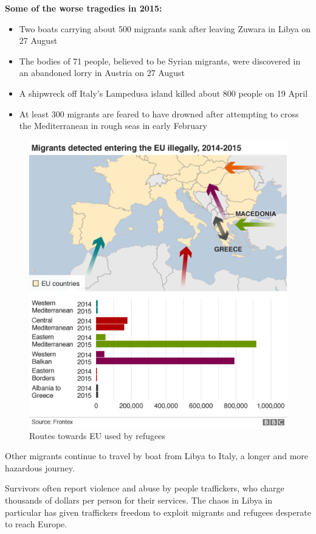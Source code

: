 \newpage
\textbf{Some of the worse tragedies in 2015:}
\begin{itemize}
	\item Two boats carrying about 500 migrants sank after leaving Zuwara in Libya on 27 August
	\item The bodies of 71 people, believed to be Syrian migrants, were discovered in an abandoned lorry in Austria on 27 August
	\item A shipwreck off Italy's Lampedusa island killed about 800 people on 19 April
	\item At least 300 migrants are feared to have drowned after attempting to cross the Mediterranean in rough seas in early February
\end{itemize}

\begin{figure}[!h]
	\begin{center}
		\includegraphics[width=0.8\linewidth]{images/routes_migrants}
		\caption{Routes towards EU used by refugees}
	\end{center}
\end{figure}

\newpage
Other migrants continue to travel by boat from Libya to Italy, a longer and more hazardous journey. 

Survivors often report violence and abuse by people traffickers, who charge thousands of dollars per person for their services. The chaos in Libya in particular has given traffickers freedom to exploit migrants and refugees desperate to reach Europe.

